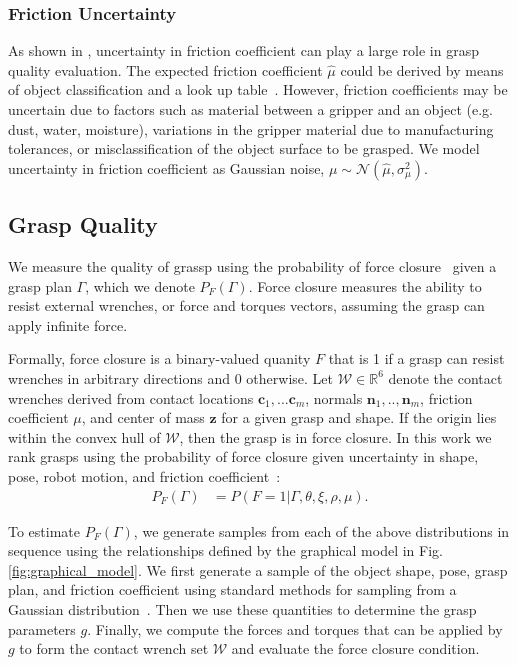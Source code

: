 \documentclass[journal,transmag]{IEEEtran}%
\newcommand{\bc}{\mathbf{c}}
\newcommand{\bn}{\mathbf{n}}
\newcommand{\bz}{\mathbf{z}}
\newcommand{\mN}{\mathcal{N}}
\newcommand{\mW}{\mathcal{W}}
\begin{document}
 \subsubsection{Friction Uncertainty}
As shown in \cite{zheng2005}, uncertainty in friction coefficient can play a large role in grasp quality evaluation.
The expected friction coefficient $\hat{\mu}$ could be derived by means of object classification and a look up table~\cite{}.
However, friction coefficients may be uncertain due to factors such as material between a gripper and an object (e.g. dust, water, moisture), variations in the gripper material due to manufacturing tolerances, or misclassification of the object surface to be grasped.
We model uncertainty in friction coefficient as Gaussian noise, $\mu \sim \mN(\hat{\mu},\sigma_{\mu}^2)$. 
 
\subsection{Grasp Quality}
We measure the quality of grassp using the probability of force closure~\cite{weisz2012pose, kim2012physically, kehoe2012estimating, kehoe2012toward} given a grasp plan $\Gamma$, which we denote $P_F(\Gamma)$.
Force closure measures the ability to resist external wrenches, or force and torques vectors, assuming the grasp can apply infinite force.

Formally, force closure is a binary-valued quanity $F$ that is 1 if a grasp can resist wrenches in arbitrary directions and 0 otherwise.
Let $\mW \in \mathbb{R}^6$ denote the contact wrenches derived from contact locations $\bc_1, ... \bc_m$, normals $\bn_1, .., \bn_m$, friction coefficient $\mu$, and center of mass $\bz$ for a given grasp and shape.
If the origin lies within the convex hull of $\mW$, then the grasp is in force closure\cite{}.
In this work we rank grasps using the probability of force closure given uncertainty in shape, pose, robot motion, and friction coefficient~\cite{christopoulos2007handling, kehoe2012toward}:
\begin{align*}
	P_F(\Gamma) &= P(F = 1 | \Gamma, \theta, \xi, \rho, \mu).
\end{align*}
 
To estimate $P_F(\Gamma)$, we generate  samples from each of the above distributions in sequence using the relationships defined by the graphical model in Fig. \ref{fig:graphical_model}.
We first generate a sample of the object shape, pose, grasp plan, and friction coefficient using standard methods for sampling from a Gaussian distribution~\cite{}.
Then we use these quantities to determine the grasp parameters $g$. 
Finally, we compute the forces and torques that can be applied by $g$ to form the contact wrench set $\mW$ and evaluate the force closure condition.
\end{document}
